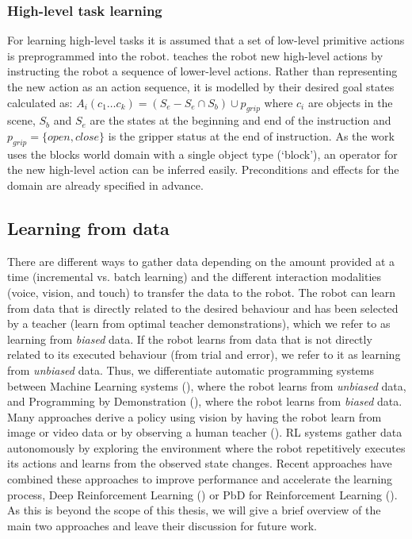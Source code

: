 \subsubsection{High-level task learning}
For learning high-level tasks it is assumed that a set of low-level primitive actions is preprogrammed into the robot. 
\cite{she2014teaching} teaches the robot new high-level actions by instructing the robot a sequence of lower-level actions.
Rather than representing the new action as an action sequence, it is modelled by their desired goal states calculated as:
$A_i(c_1 \dots c_k) = (S_e - S_e \cap S_b) \cup p_{grip}$ where $c_i$ are objects in the scene, $S_b$ and $S_e$ are the states at the beginning and end of the instruction and $p_{grip} = \{open, close\}$ is the gripper status at the end of instruction.
As the work uses the blocks world domain with a single object type (`block'), an operator for the new high-level action can be inferred easily. Preconditions and effects for the domain are already specified in advance.

\subsection{Learning from data} \label{subsec:Gathering data}
There are different ways to gather data depending on the amount provided at a time (incremental vs. batch learning) and the different interaction modalities (voice, vision, and touch) to transfer the data to the robot.
The robot can learn from data that is directly related to the desired behaviour and has been selected by a teacher (\eg learn from optimal teacher demonstrations), which we refer to as learning from \textit{biased} data.
If the robot learns from data that is not directly related to its executed behaviour (\eg from trial and error), we refer to it as learning from \textit{unbiased} data.
Thus, we differentiate automatic programming systems between Machine Learning systems (), where the robot learns from \textit{unbiased} data, and Programming by Demonstration (), where the robot learns from \textit{biased} data.
Many approaches derive a policy using vision by having the robot learn from image or video data or by observing a human teacher (\cite{kuniyoshi1994learning}).
RL systems gather data autonomously by exploring the environment where the robot repetitively executes its actions and learns from the observed state changes.
Recent approaches have combined these approaches to improve performance and accelerate the learning process, \eg Deep Reinforcement Learning (\cite{arulkumaran2017brief}) or PbD for Reinforcement Learning (\cite{hester2017learning}).
As this is beyond the scope of this thesis, we will give a brief overview of the main two approaches and leave their discussion for future work.


